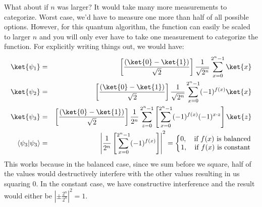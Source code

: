 \documentclass[preprint,aps,prd,nofootinbib,superscriptaddress]{revtex4-2}
\newcommand{\BraKet}[2]{\langle #1 | #2 \rangle}
\begin{document}
%
What about if $n$ was larger? It would take many more measurements to categorize. Worst case, we'd have to measure one more than half of all possible options. However, for this quantum algorithm, the function can easily be scaled to larger $n$ and you will only ever have to take one measurement to categorize the function. For explicitly writing things out, we would have:
%
\begin{eqnarray}
\ket{\psi_1} &=& \left[\frac{(\ket{0} - \ket{1})}{\sqrt{2}}\right] \frac{1}{\sqrt{2^{n}}} \sum \limits_{x=0}^{2^n - 1}\ket{x}
\nonumber \\
\ket{\psi_2} &=& \left[\frac{(\ket{0} - \ket{1})}{\sqrt{2}}\right] \frac{1}{\sqrt{2^{n}}} \sum \limits_{x=0}^{2^n - 1} (-1)^{f(x)}\ket{x}
\nonumber \\
\ket{\psi_3} &=& \left[\frac{(\ket{0} - \ket{1})}{\sqrt{2}}\right] \frac{1}{2^n} \sum \limits_{z=0}^{2^n - 1} \left[ \sum \limits_{x=0}^{2^n - 1} (-1)^{f(x)} (-1)^{x \cdot z} \right]\ket{z}
\nonumber \\
\BraKet{\psi_3}{\psi_3} &=& \left|\frac{1}{2^n} \left[ \sum \limits_{x=0}^{2^n - 1} (-1)^{f(x)} \right] \right|^2 = \left\lbrace 
\begin{matrix}
0, \quad \text{if } f(x) \text{ is balanced}\\ 
1, \quad \text{if } f(x) \text{ is constant}
\end{matrix}
\right.
\end{eqnarray}
%
This works because in the balanced case, since we sum before we square, half of the values would destructively interfere with the other values resulting in us squaring 0. In the constant case, we have constructive interference and the result would either be $\left|\pm\frac{2^n}{2^n} \right|^2 = 1$.
%


\begin{thebibliography}{99}



\end{thebibliography}
\end{document}
